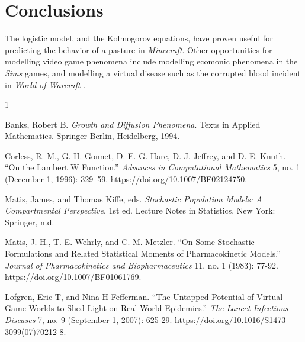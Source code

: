 \documentclass{article}
\theoremstyle{theorem}
\theoremstyle{definition}
\begin{document}
\section{Conclusions} The logistic model, and the Kolmogorov equations, have proven useful for predicting the behavior of a pasture in \textit{Minecraft}. Other opportunities for modelling video game phenomena include modelling ecomonic phenomena in the \textit{Sims} games, and modelling a virtual disease such as the corrupted blood incident in \textit{World of Warcraft} \cite{lofgren}.

\begin{thebibliography}{1}

     Banks, Robert B. \textit{Growth and Diffusion Phenomena}. Texts in Applied Mathematics. Springer Berlin, Heidelberg, 1994.

     Corless, R. M., G. H. Gonnet, D. E. G. Hare, D. J. Jeffrey, and D. E. Knuth. “On the Lambert W Function.” \textit{Advances in Computational Mathematics} 5, no. 1 (December 1, 1996): 329–59. https://doi.org/10.1007/BF02124750.

     Matis, James, and Thomas Kiffe, eds. \textit{Stochastic Population Models: A Compartmental Perspective}. 1st ed. Lecture Notes in Statistics. New York: Springer, n.d.

     Matis, J. H., T. E. Wehrly, and C. M. Metzler. “On Some Stochastic Formulations and Related Statistical Moments of Pharmacokinetic Models.” \textit{Journal of Pharmacokinetics and Biopharmaceutics} 11, no. 1 (1983): 77-92. https://doi.org/10.1007/BF01061769.

     Lofgren, Eric T, and Nina H Fefferman. “The Untapped Potential of Virtual Game Worlds to Shed Light on Real World Epidemics.” \textit{The Lancet Infectious Diseases} 7, no. 9 (September 1, 2007): 625-29. https://doi.org/10.1016/S1473-3099(07)70212-8.


\end{thebibliography}
\end{document}
